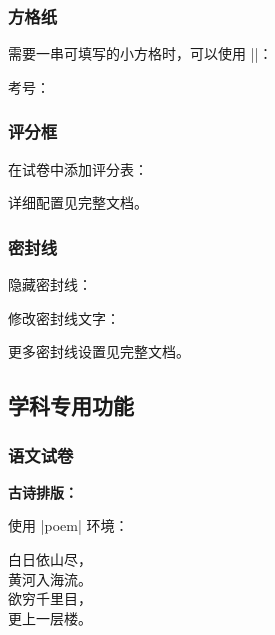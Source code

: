 \subsubsection{方格纸}

需要一串可填写的小方格时，可以使用 |\examsquare|：

\begin{latexcode}
  考号：
\end{latexcode}

\subsubsection{评分框}

在试卷中添加评分表：

\begin{latexcode}
  \scoringbox
\end{latexcode}

详细配置见完整文档。

\subsubsection{密封线}

隐藏密封线：

\begin{latexcode}
\end{latexcode}

修改密封线文字：

\begin{latexcode}
\end{latexcode}

更多密封线设置见完整文档。


\subsection{学科专用功能}

\subsubsection{语文试卷}

\textbf{古诗排版：}

使用 |poem| 环境：

\begin{latexcode}
  \begin{poem}
    白日依山尽，\\
    黄河入海流。\\
    欲穷千里目，\\
    更上一层楼。
  \end{poem}
\end{latexcode}

